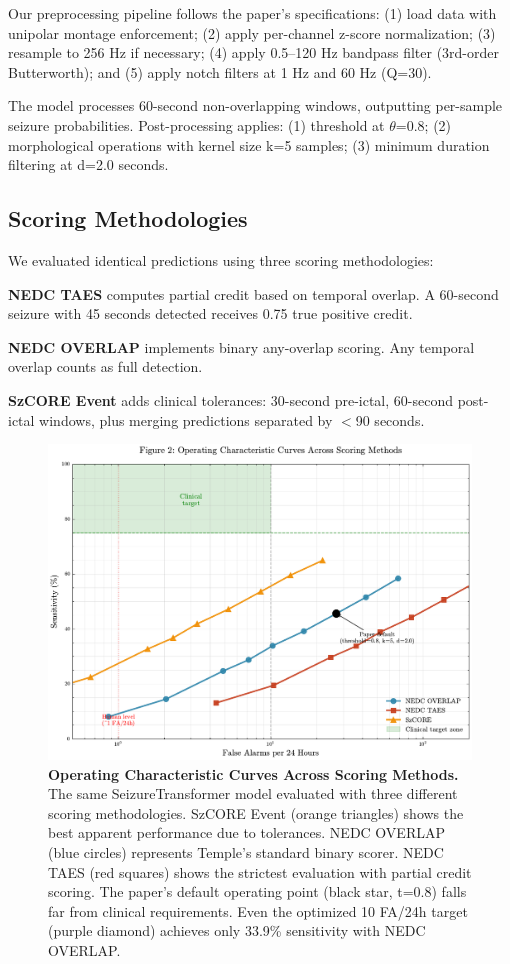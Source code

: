 \documentclass[10pt,a4paper]{article}
\begin{document}
Our preprocessing pipeline follows the paper's specifications: (1) load data with unipolar montage enforcement; (2) apply per-channel z-score normalization; (3) resample to 256 Hz if necessary; (4) apply 0.5--120 Hz bandpass filter (3rd-order Butterworth); and (5) apply notch filters at 1 Hz and 60 Hz (Q=30).

The model processes 60-second non-overlapping windows, outputting per-sample seizure probabilities. Post-processing applies: (1) threshold at $\theta$=0.8; (2) morphological operations with kernel size k=5 samples; (3) minimum duration filtering at d=2.0 seconds.

\subsection{Scoring Methodologies}

We evaluated identical predictions using three scoring methodologies:

\textbf{NEDC TAES} computes partial credit based on temporal overlap. A 60-second seizure with 45 seconds detected receives 0.75 true positive credit.

\textbf{NEDC OVERLAP} implements binary any-overlap scoring. Any temporal overlap counts as full detection.

\textbf{SzCORE Event} adds clinical tolerances: 30-second pre-ictal, 60-second post-ictal windows, plus merging predictions separated by $<$90 seconds.

\begin{figure}[t]
    \centering
    \includegraphics[width=\textwidth]{../figures/output/arxiv/fig2_operating_curves.pdf}
    \caption{\textbf{Operating Characteristic Curves Across Scoring Methods.} The same SeizureTransformer model evaluated with three different scoring methodologies. SzCORE Event (orange triangles) shows the best apparent performance due to tolerances. NEDC OVERLAP (blue circles) represents Temple's standard binary scorer. NEDC TAES (red squares) shows the strictest evaluation with partial credit scoring. The paper's default operating point (black star, t=0.8) falls far from clinical requirements. Even the optimized 10 FA/24h target (purple diamond) achieves only 33.9\% sensitivity with NEDC OVERLAP.}
    \label{fig:operating_curves}
\end{figure}
\end{document}

